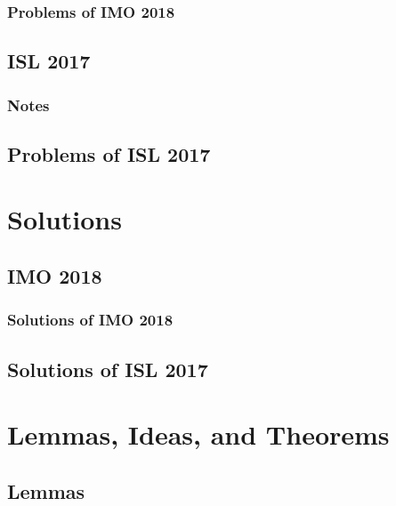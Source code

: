 \documentclass[]{book}
\theoremstyle{definition}
\begin{document}
\subsection{Problems of IMO 2018}

\newpage

\section{ISL 2017}

\subsection{Notes}

\newpage
\section{Problems of ISL 2017}

\newpage



\chapter{Solutions}

\section{IMO 2018}

\subsection{Solutions of IMO  2018}

\newpage

\section{Solutions of ISL 2017}

\newpage

\chapter{Lemmas, Ideas, and Theorems}

\section{Lemmas}

\end{document}
